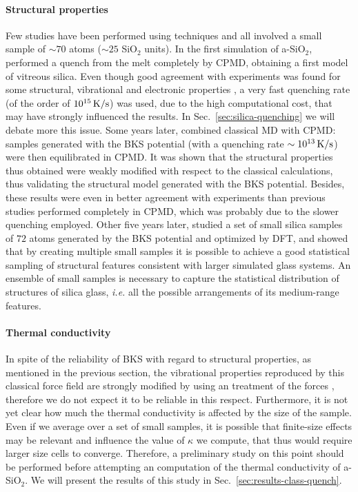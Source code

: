 \paragraph{Structural properties}
Few studies have been performed using \abinitio techniques and all involved a small sample of $\sim 70$ atoms ($\sim 25$ SiO$_2$ units). In the first \abinitio simulation of a-SiO$_2$, \textcite{Sarnthein1995a} performed a quench from the melt completely by CPMD, obtaining a first model of vitreous silica. Even though good agreement with experiments was found for some structural, vibrational and electronic properties \cite{Sarnthein1995a,Sarnthein1995b,Sarnthein1997}, a very fast quenching rate (of the order of $10^{15}\,\mathrm{K/s}$) was used, due to the high computational cost, that may have strongly influenced the results. In Sec.~\ref{sec:silica-quenching} we will debate more this issue. 
Some years later, \textcite{Benoit2000} combined classical MD with CPMD: samples generated with the BKS potential (with a quenching rate $\sim 10^{13}\,\mathrm{K/s}$) were then equilibrated in CPMD. It was shown that the structural properties thus obtained were weakly modified with respect to the classical calculations, thus validating the structural model generated with the BKS potential. Besides, these results were even in better agreement with experiments than previous studies performed completely in CPMD, which was probably due to the slower quenching employed. 
Other five years later, \textcite{VanGinhoven2005} studied a set of small silica samples of $72$ atoms generated by the BKS potential and optimized by DFT, and showed that by creating multiple small samples it is possible to achieve a good statistical sampling of structural features consistent with larger simulated glass systems. An ensemble of small samples is necessary to capture the statistical distribution of structures of silica glass, \emph{i.e.} all the possible arrangements of its medium-range features. 

\paragraph{Thermal conductivity}
In spite of the reliability of BKS with regard to structural properties, as mentioned in the previous section, the vibrational properties reproduced by this classical force field are strongly modified by using an \abinitio treatment of the forces \cite{Benoit2002}, therefore we do not expect it to be reliable in this respect. 
Furthermore, it is not yet clear how much the thermal conductivity is affected by the size of the sample. Even if we average over a set of small samples, it is possible that finite-size effects may be relevant and influence the value of $\kappa$ we compute, that thus would require larger size cells to converge. 
Therefore, a preliminary study on this point should be performed before attempting an \abinitio computation of the thermal conductivity of a-SiO$_2$. We will present the results of this study in Sec.~\ref{sec:results-class-quench}.



